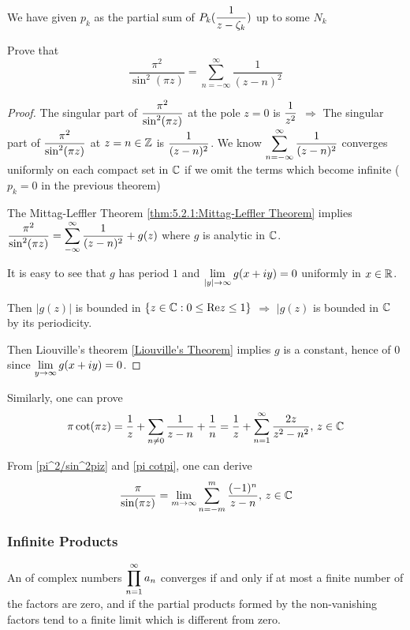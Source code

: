 \begin{remark}
    We have given  $ p_k $ as the partial sum of  $ \displaystyle P_k(\frac{1}{z-\zeta_k}) $ up to some  $ N_k $   
\end{remark}
\begin{example}
    Prove that 
    \begin{equation}\label{pi^2/sin^2piz}
        \frac{\pi^2}{\sin^2(\pi z)}=\sum_{n=-\infty}^\infty\frac{1}{(z-n)^2}    
    \end{equation}
\end{example}
\begin{proof}
    The singular part of  $ \displaystyle\frac{\pi^2}{\sin^2(\pi z)} $ at the pole  $ z=0 $ is  $ \displaystyle\frac{1}{z^2} $ $ \Rightarrow  $ The singular part
    of  $ \displaystyle\frac{\pi^2}{\sin^2(\pi z)} $    at  $ z=n\in\mathbb Z $ is  $ \displaystyle\frac{1}{(z-n)^2}$. We know  $ \displaystyle\sum_{n=-\infty}^\infty\frac{1}{(z-n)^2} $
    converges uniformly on each compact set in  $ \mathbb C  $ if we omit the terms which become infinite (\ie  $ p_k =0 $ in the previous theorem)
    
    The Mittag-Leffler Theorem \ref{thm:5.2.1:Mittag-Leffler Theorem} implies  $ \displaystyle\frac{\pi^2}{\sin^2(\pi z)}=\displaystyle\sum_{-\infty}^\infty \frac{1}{(z-n)^2}+g(z) $ 
    where  $ g  $ is analytic in  $ \mathbb C $.
    
    It is easy to see that  $  g  $ has period  $ 1  $ and  $ \displaystyle\lim_{|y|\to\infty}g(x+iy)=0 $ uniformly in  $ x\in \mathbb R $.
    
    Then  $ |g(z)| $ is bounded in  $ \{z\in \mathbb C:0 \leq \mathrm{Re} z \leq 1\} $ $ \Rightarrow  $  $ |g(z) $ is bounded in  $ \mathbb C $ by its periodicity.
    
    Then Liouville's theorem \ref{Liouville's Theorem} implies  $ g  $ is a constant, hence of  $ 0  $ since  $ \displaystyle\lim_{y\to\infty}g(x+iy)=0 $. 
\end{proof}
Similarly, one can prove 
\begin{equation}\label{pi cotpi}
    \pi\cot(\pi z)=\frac{1}{z}+\sum_{n\neq 0}\frac{1}{z-n}+\frac{1}{n}=\frac{1}{z}+\sum_{n=1}^\infty\frac{2z}{z^2-n^2},\,z\in \mathbb C
\end{equation}

From  \eqref{pi^2/sin^2piz} and \eqref{pi cotpi}, one can derive 
\begin{equation}
    \frac{\pi}{\sin(\pi z)}=\lim_{m\to\infty}\sum_{n=-m}^m\frac{(-1)^n}{z-n},\,z\in\mathbb C
\end{equation}
\subsubsection{Infinite Products}
An  of complex numbers  $ \displaystyle\prod_{n=1}^\infty a_n $ converges if and only if at most a finite number of the factors are zero,
and if the partial products formed by the non-vanishing factors tend to a finite limit which is different from zero. 

